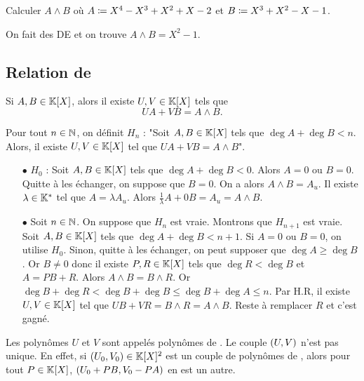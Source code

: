 \documentclass{magnolia}
\begin{document}
\begin{exoUnique}
\exo Calculer $A\wedge B$ où $A\coloneqq X^4-X^3+X^2+X-2$ et $B\coloneqq X^3+X^2-X-1$.
  \begin{sol}
  On fait des DE et on trouve $A\wedge B=X^2-1$.
  \end{sol}
\end{exoUnique}


\subsection{Relation de }

\begin{proposition}
Si $A,B\in\polyK$, alors il existe $U,V\in\polyK$ tels que
\[UA+VB=A\wedge B.\]
\end{proposition}

\begin{preuve}
Pour tout $n\in \mathbb{N}$, on définit $H_n$ : "Soit $A,B \in \polyK$ tels que $\deg A+\deg B<n$. Alors, il existe $U,V \in \polyK$ tel que $UA+VB=A\wedge B$".
\begin{itemize}
\item[$\bullet$] $H_0$ : Soit $A,B \in \polyK$ tels que $\deg A+\deg B<0$. Alors $A=0$ ou $B=0$. Quitte à les échanger, on suppose que $B=0$. On a alors $A\wedge B=A_u$. Il existe $\lambda \in \mathbb{K}^*$ tel que $A=\lambda A_u$. Alors $\frac{1}{\lambda}A+0B=A_u=A\wedge B$.
\item[$\bullet$] Soit $n\in \mathbb{N}$. On suppose que $H_n$ est vraie. Montrons que $H_{n+1}$ est vraie. Soit $A,B \in \polyK$ tels que $\deg A+\deg B<n+1$. Si $A=0$ ou $B=0$, on utilise $H_0$. Sinon, quitte à les échanger, on peut supposer que $\deg A\geq \deg B$. Or $B\neq 0$ donc il existe $P,R\in \polyK$ tels que $\deg R < \deg B$ et $A=PB+R$. Alors $A\wedge B= B\wedge R$. Or $\deg B+\deg R <\deg B+\deg B\leq \deg B+\deg A \leq n$. Par H.R, il existe $U,V \in \polyK$ tel que $UB+VR=B\wedge R=A\wedge B$. Reste à remplacer $R$ et c'est gagné.
\end{itemize}
\end{preuve}

\begin{remarques}
\remarque Les polynômes $U$ et $V$ sont appelés polynômes de .
\remarque Le couple $\left(U,V\right)$ n'est pas unique. En effet,
  si $\p{U_0,V_0}\in\polyK^2$ est un couple de polynômes de , alors pour
  tout $P\in\polyK$, $\left(U_0+PB,V_0-PA\right)$ en est un autre.
\end{remarques}
\end{document}
